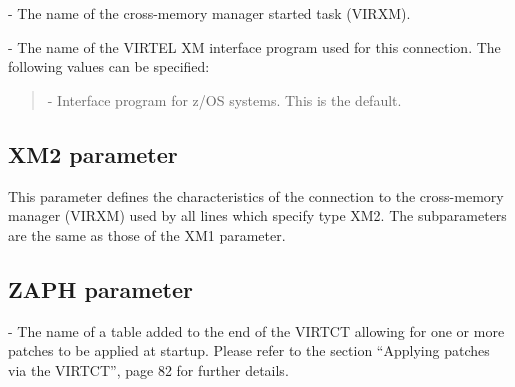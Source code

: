 \documentclass[letterpaper,10pt,english]{sphinxmanual}
\begin{document}
 - The name of the cross-memory manager started task (VIRXM).

 - The name of the VIRTEL XM interface program used for this connection. The following values can be specified:
\begin{quote}

 - Interface program for z/OS systems. This is the default.
\end{quote}


\subsection{XM2 parameter}
\label{\detokenize{Installation_Guide:xm2-parameter}}
\begin{sphinxVerbatim}[commandchars=\\\{\}]
    
\PYG{p}{[}\PYG{p}{]}\PYG{p}{[}\PYG{p}{]}
\end{sphinxVerbatim}

This parameter defines the characteristics of the connection to the cross-memory manager (VIRXM) used by all lines which specify type XM2. The subparameters are the same as those of the XM1 parameter.

\ignorespaces 

\subsection{ZAPH parameter}
\label{\detokenize{Installation_Guide:zaph-parameter}}\label{\detokenize{Installation_Guide:index-142}}
\begin{sphinxVerbatim}[commandchars=\\\{\}]
 
\end{sphinxVerbatim}

 - The name of a table added to the end of the VIRTCT allowing for one or more patches to be applied at startup. Please refer to the section “Applying patches via the VIRTCT”, page 82 for further details.
\end{document}
